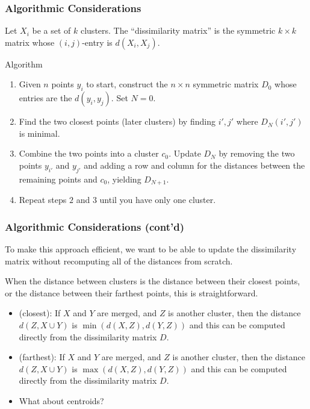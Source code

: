 \documentclass[colorlinks=true,linkcolor=blue]{beamer}
\begin{document}
\begin{frame}
  \frametitle{Algorithmic Considerations}
  \begin{definition} Let $X_i$ be a set of $k$ clusters.  The ``dissimilarity matrix'' is the symmetric $k\times k$
    matrix whose $(i,j)$-entry is $d(X_i,X_j)$.
  \end{definition}
\begin{block}{Algorithm}
  \begin{enumerate}
  \item Given $n$ points $y_i$ to start, construct  the $n\times n$ symmetric matrix $D_0$ whose entries
    are the $d(y_i,y_j)$.  Set $N=0$.
  \item Find the two closest points (later clusters) by finding $i',j'$ where $D_N(i',j')$ is minimal.
  \item Combine the two points into a cluster $c_0$.  Update $D_N$ by removing the two points $y_{i'}$ and $y_{j'}$ and
    adding a row and column for the distances between the remaining points and $c_0$, yielding $D_{N+1}$.
  \item Repeat steps $2$ and $3$ until you have only one cluster.
  \end{enumerate}
\end{block}
\end{frame}
\begin{frame}
  \frametitle{Algorithmic Considerations (cont'd)}
  To make this approach efficient, we want to be able to update the dissimilarity matrix without recomputing all of the distances from scratch.

  When the distance between clusters is the distance between their closest points, or the distance between their farthest points, this is straightforward.

  \begin{itemize}
  \item (closest): If $X$ and $Y$ are merged, and $Z$ is another cluster, then the distance $d(Z,X\cup Y)$ is
    $\min(d(X,Z),d(Y,Z))$ and this can be computed directly from the dissimilarity matrix $D$.
    \item (farthest): If $X$ and $Y$ are merged, and $Z$ is another cluster, then the distance $d(Z,X\cup Y)$ is
    $\max(d(X,Z),d(Y,Z))$ and this can be computed directly from the dissimilarity matrix $D$.
    \item What about centroids?
  \end{itemize}
\end{frame}
\end{document}
